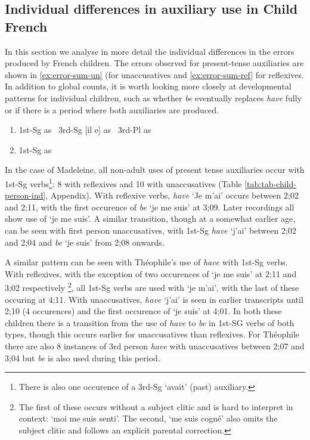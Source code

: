 \documentclass[
  12pt,
]{article}
\begin{document}
\hypertarget{individual-Fr}{%
\subsection{Individual differences in auxiliary use in Child French}\label{individual-Fr}}

In this section we analyse in more detail the individual differences in the errors produced by French children. The errors observed for present-tense auxiliaries are shown in \ref{ex:error-sum-un} (for unaccusatives and \ref{ex:error-sum-ref} for reflexives. In addition to global counts, it is worth looking more closely at developmental patterns for individual children, such as whether \emph{be} eventually replaces \emph{have} fully or if there is a period where both auxiliaries are produced.

\begin{enumerate}[resume*]
  \item {1st-Sg \textipa{[Z(@) s4i]}  \tab   as \tab   \textipa{[Z e]}\label{ex:error-sum-un}}\newline
  \   3rd-Sg    [il e]    \tab    as \tab   [il a]\newline
  \   3rd-Pl    \textipa{[i  s\~O]}  \tab  as \tab   \textipa{[iz \~O]}  
  \item {1st-Sg \textipa{[Z(@) m@ s4i]}  \tab as \tab    \textipa{[Z(@) m e]}\label{ex:error-sum-ref}}
\end{enumerate}

In the case of Madeleine, all non-adult uses of present tense auxiliaries occur with 1st-Sg verbs\footnote{There is also one occurence of a 3rd-Sg `avait' (past) auxiliary.}: 8 with reflexives and 10 with unaccusatives (Table \ref{tab:tab-child-person-ind}, Appendix). With reflexive verbs, \emph{have} `Je m'ai' occurs between 2;02 and 2;11, with the first occurence of \emph{be} `je me suis' at 3;09. Later recordings all show use of `je me suis'. A similar transition, though at a somewhat earlier age, can be seen with first person unaccusatives, with 1st-Sg \emph{have} `j'ai' between 2;02 and 2;04 and \emph{be} `je suis' from 2;08 onwards.

A similar pattern can be seen with Théophile's use of \emph{have} with 1st-Sg verbs. With reflexives, with the exception of two occurences of `je me suis' at 2;11 and 3;02 respectively \footnote{The first of these occurs without a subject clitic and is hard to interpret in context: `moi me suis senti'. The second, `me suis cogné' also omits the subject clitic and follows an explicit parental correction.}, all 1st-Sg verbs are used with `je m'ai', with the last of these occuring at 4;11. With unaccusatives, \emph{have} `j'ai' is seen in earlier transcripts until 2;10 (4 occurences) and the first occurence of `je suis' at 4;01. In both these children there is a transition from the use of \emph{have} to \emph{be} in 1st-SG verbs of both types, though this occurs earlier for unaccusatives than reflexives. For Théophile there are also 8 instances of 3rd person \emph{have} with unaccusatives between 2;07 and 3;04 but \emph{be} is also used during this period.
\end{document}
